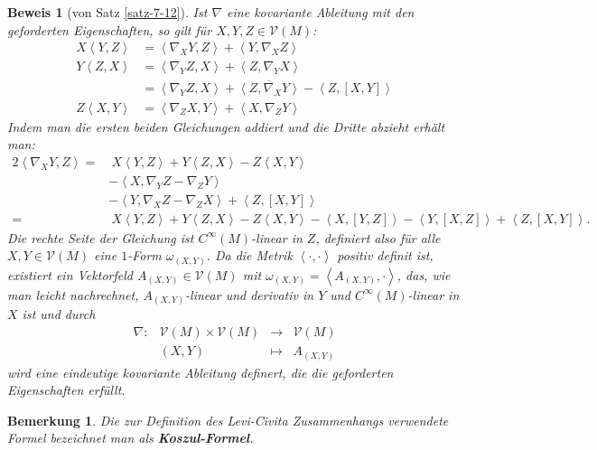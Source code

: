 \documentclass[paper=A4, twoside, chapterprefix=true, bibliography=totoc, headsepline]{scrbook}
\theoremstyle{plain}
\theoremstyle{nonumberplain}
\newtheorem{bem}{Bemerkung}
\newtheorem{bew}{Beweis}
\theoremstyle{empty}
\theoremstyle{break}
\newcommand{\CmIndex}[2][]{\ifthenelse{\isempty{#1}}{\index{#2}}{\index{#1}}#2}
\newcommand{\CmMark}[2][]{\textbf{\CmIndex[#1]{#2}}}
\begin{document}
\begin{bew}[von Satz \ref{satz-7-12}]
  Ist $\nabla$ eine kovariante Ableitung mit den geforderten Eigenschaften, so gilt f\"ur $X,Y,Z \in \mathcal V(M)$:
  \begin{align*}
    X\left<Y,Z\right> & = \left<\nabla_XY,Z\right> + \left<Y,\nabla_XZ\right>\\
    Y\left<Z,X\right> & = \left<\nabla_YZ,X\right> + \left<Z,\nabla_YX\right>\\
    & = \left<\nabla_YZ,X\right> + \overline{\left<Z,\nabla_XY\right>} - \left<Z,[X,Y]\right>\\
    Z\left<X,Y\right> & = \left<\nabla_ZX,Y \right> + \left<X,\nabla_ZY\right>
  \end{align*}
  Indem man die ersten beiden Gleichungen addiert und die Dritte abzieht erh\"alt man:
  \begin{align*}
    2\left<\nabla_XY,Z\right> = & \ X \left<Y,Z\right> + Y\left<Z,X\right> - Z\left<X,Y\right>\\
    & - \left<X,\nabla_YZ - \nabla_ZY\right> \\
    & - \left<Y,\nabla_XZ - \nabla_ZX\right> + \left<Z,[X,Y]\right>\\
    = & \ X\left<Y,Z\right> + Y\left<Z,X\right> - Z\left<X,Y\right> - \left<X,[Y,Z]\right> - \left<Y,[X,Z]\right> + \left<Z,[X,Y]\right>.
  \end{align*}
  Die rechte Seite der Gleichung ist $C^{\infty}(M)$-linear in $Z$, definiert also f\"ur alle $X,Y \in \mathcal V(M)$ eine $1$-Form $\omega_{(X,Y)}$.
  Da die Metrik $\left<\cdot,\cdot\right>$ positiv definit ist, existiert ein Vektorfeld $A_{(X,Y)} \in \mathcal V(M)$ mit $\omega_{(X,Y)} = \left<A_{(X,Y)},\cdot\right>$, das, wie man leicht nachrechnet, $A_{(X,Y)}$-linear und derivativ in $Y$ und $C^{\infty}(M)$-linear in $X$ ist und durch
  \[\begin{array}{cccc}
    \nabla \colon & \mathcal V(M) \times \mathcal V(M) &\to& \mathcal V(M)\\
    &(X,Y) &\mapsto& A_{(X,Y)}
  \end{array}\]
  wird eine eindeutige kovariante Ableitung definert, die die geforderten Eigenschaften erf\"ullt.
\end{bew}

\begin{bem}
  Die zur Definition des Levi-Civita Zusammenhangs verwendete Formel bezeichnet man als \CmMark{Koszul-Formel}.
\end{bem}
\end{document}
